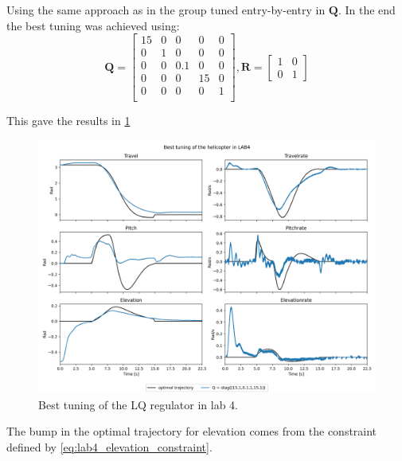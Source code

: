 \documentclass[../main.tex]{subfiles}
\begin{document}

Using the same approach as in the group tuned entry-by-entry in $ \bm Q $. In the end the best tuning was achieved using: 
\begin{equation}\label{key}
	\bm Q = \begin{bmatrix}
		15 & 0 & 0 & 0 & 0 \\
		0 & 1 & 0 & 0 & 0 \\
		0 & 0 & 0.1 & 0 & 0 \\
		0 & 0 & 0 & 15 & 0 \\
		0 & 0 & 0 & 0 & 1 \\
	\end{bmatrix}, 
	\bm R = \begin{bmatrix}
		1 & 0 \\ 
		0 & 1
	\end{bmatrix}
\end{equation}

This gave the results in \cref{fig:LAB4_best_tuning}
\begin{figure}[h]
	\centering
	\includegraphics[width=\linewidth]{figures/LAB4_best_tunings.png}
	\caption{Best tuning of the LQ regulator in lab 4.}
	\label{fig:LAB4_best_tuning}
\end{figure}
The bump in the optimal trajectory for elevation comes from the constraint defined by \cref{eq:lab4_elevation_constraint}. 
\end{document}
